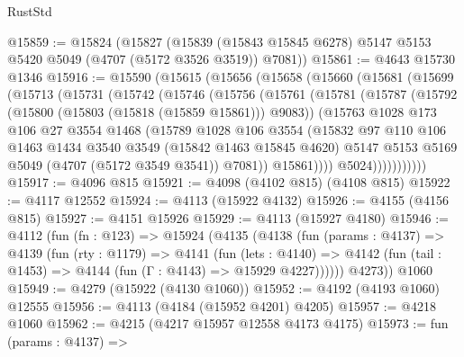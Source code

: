 \begin{lexlean}{RustStd}
\begin{coremodule}
@15859 := @15824
    (@15827
      (@15839 (@15843 @15845 @6278) @5147 @5153 @5420 @5049 (@4707 (@5172 @3526 @3519)) @7081))
@15861 := @4643 @15730 @1346
@15916 := @15590
    (@15615
      (@15656
        (@15658
          (@15660
            (@15681
              (@15699
                (@15713
                  (@15731
                    (@15742
                      (@15746
                        (@15756
                          (@15761
                            (@15781
                              (@15787
                                (@15792 (@15800 (@15803 (@15818 (@15859 @15861))) @9083))
                                (@15763
                                  @1028
                                  @173
                                  @106
                                  @27
                                  @3554
                                  @1468
                                  (@15789
                                    @1028
                                    @106
                                    @3554
                                    (@15832
                                      @97
                                      @110
                                      @106
                                      @1463
                                      @1434
                                      @3540
                                      @3549
                                      (@15842 @1463 @15845 @4620)
                                      @5147
                                      @5153
                                      @5169
                                      @5049
                                      (@4707 (@5172 @3549 @3541))
                                      @7081))
                                  @15861))))
                          @5024)))))))))))
@15917 := @4096 @815
@15921 := @4098 (@4102 @815) (@4108 @815)
@15922 := @4117 @12552
@15924 := @4113 (@15922 @4132)
@15926 := @4155 (@4156 @815)
@15927 := @4151 @15926
@15929 := @4113 (@15927 @4180)
@15946 := @4112
    (fun (fn : @123) =>
    @15924
      (@4135
        (@4138
          (fun (params : @4137) =>
          @4139
            (fun (rty : @1179) =>
            @4141
              (fun (lets : @4140) =>
              @4142 (fun (tail : @1453) => @4144 (fun (Γ : @4143) => @15929 @4227))))))
        @4273))
    @1060
@15949 := @4279 (@15922 (@4130 @1060))
@15952 := @4192 (@4193 @1060) @12555
@15956 := @4113 (@4184 (@15952 @4201) @4205)
@15957 := @4218 @1060
@15962 := @4215 (@4217 @15957 @12558 @4173 @4175)
@15973 := fun (params : @4137) =>

\end{coremodule}
\end{lexlean}
